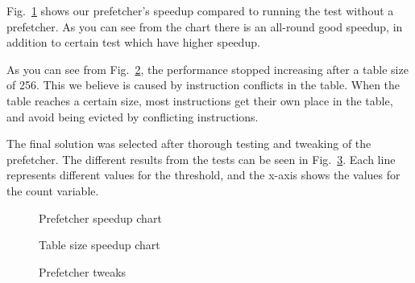 Fig.~\ref{fig:prefetcher_speedup} shows our prefetcher's speedup compared to
running the test without a prefetcher. As you can see from the chart there is
an all-round good speedup, in addition to certain test which have higher
speedup.

As you can see from Fig.~\ref{fig:table_size_chart}, the performance stopped
increasing after a table size of 256. This we believe is caused by instruction
conflicts in the table. When the table reaches a certain size, most
instructions get their own place in the table, and avoid being evicted by
conflicting instructions.

The final solution was selected after thorough testing and tweaking of the
prefetcher. The different results from the tests can be seen in
Fig.~\ref{fig:prefetcher_tweaks}. Each line represents different values for the
threshold, and the x-axis shows the values for the count variable.

\begin{figure}
	
	\caption{Prefetcher speedup chart}
	\label{fig:prefetcher_speedup}
\end{figure}

\begin{figure}
	
	\caption{Table size speedup chart}
	\label{fig:table_size_chart}
\end{figure}

\begin{figure}
	
	\caption{Prefetcher tweaks}
	\label{fig:prefetcher_tweaks}
\end{figure}
